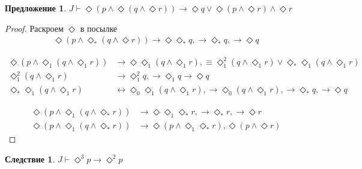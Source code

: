 \documentclass[12pt,a4paper,oneside]{article}
\newtheorem{proposition}{Предложение}
\newtheorem*{corollary}{Следствие}
\begin{document}
  \begin{proposition}
    $J \vdash  \Diamond (p \wedge  \Diamond (q \wedge  \Diamond  r)) \rightarrow  \Diamond q \vee 
    \Diamond (p \wedge  \Diamond r) \wedge  \Diamond r$ 
  \end{proposition}
  \begin{proof}
    Раскроем $\Diamond $ в посылке
    \begin{align*}
      \Diamond (p \wedge  \Diamond_* (q \wedge  \Diamond  r)) \rightarrow  \Diamond \Diamond_* q,
      \rightarrow  \Diamond_* q, \rightarrow  \Diamond q
    \end{align*}

    \begin{align*}
      \Diamond (p \wedge  \Diamond_1 (q \wedge  \Diamond_1 r)) &\rightarrow  \Diamond \Diamond_1 (q
      \wedge  \Diamond_1 r), \equiv \Diamond_1 ^2(q \wedge  \Diamond_1 r) \vee 
      \Diamond_* \Diamond_1 (q \wedge  \Diamond_1 r)\\
      \Diamond_1 ^2(q \wedge  \Diamond_1 r) &\rightarrow  \Diamond_1 ^2 q, \rightarrow  \Diamond_1 q
      \rightarrow  \Diamond q\\
      \Diamond_* \Diamond_1 (q \wedge  \Diamond_1 r) &\leftrightarrow  \Diamond_0 \Diamond_1 (q
      \wedge  \Diamond_1 r), \rightarrow  \Diamond_0 (q \wedge  \Diamond_1 r), \rightarrow 
      \Diamond_* q, \rightarrow  \Diamond q
    \end{align*}

    \begin{align*}
      \Diamond (p \wedge  \Diamond_1 (q \wedge  \Diamond_* r)) &\rightarrow 
      \Diamond \Diamond_1 \Diamond_* r, \rightarrow  \Diamond_* r, \rightarrow  \Diamond r\\
      \Diamond (p \wedge  \Diamond_1 (q \wedge  \Diamond_* r)) &\rightarrow  \Diamond (p \wedge 
      \Diamond_1 \Diamond_* r), \Diamond (p \wedge  \Diamond r)
    \end{align*}
  \end{proof}
  \begin{corollary}
    $J \vdash  \Diamond ^3p \rightarrow  \Diamond ^2p$ 
  \end{corollary}
\end{document}
